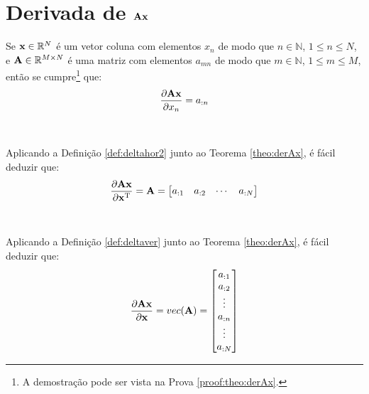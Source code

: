 
\section{Derivada de $\MATRIX{A}\VECTOR{x}$}

\begin{theorem}\label{theo:derAx}
Se 
$\VECTOR{x}\in \mathbb{R}^N$ é um vetor coluna com elementos $x_n$ de modo que
$n\in \mathbb{N}$, $1 \leq n \leq N$, e 
$\MATRIX{A} \in \mathbb{R}^{M\times N}$ é uma matriz com elementos $a_{mn}$ de modo que
$m\in \mathbb{N}$, $1 \leq m \leq M$, 
então se cumpre\footnote{A demostração pode ser vista na Prova \ref{proof:theo:derAx}.} que:
\begin{equation}
\frac{\partial \MATRIX{A}\VECTOR{x}}{\partial x_n}=a_{:n}
\end{equation}
\end{theorem}
~

\begin{corollary}\label{coro:derAx1}
Aplicando a Definição \ref{def:deltahor2} junto ao Teorema \ref{theo:derAx}, é
fácil deduzir que:
\begin{equation}
\frac{\partial \MATRIX{A}\VECTOR{x}}{\partial \VECTOR{x}^{\transpose}}=
\MATRIX{A}=
\left[
\begin{matrix}
 a_{:1} &  a_{:2} &  \cdots &  a_{:N}
\end{matrix}
\right]
\end{equation}
\end{corollary}
~

\begin{corollary}\label{coro:derAx2}
Aplicando a Definição \ref{def:deltaver} junto ao Teorema \ref{theo:derAx}, é
fácil deduzir que:
\begin{equation}
\frac{\partial \MATRIX{A}\VECTOR{x}}{\partial \VECTOR{x}}=\funcvec(\MATRIX{A})=
\left[
\begin{matrix}
 a_{:1} \\  
a_{:2} \\  
\vdots \\  
a_{:n} \\  
\vdots \\  
a_{:N}
\end{matrix}
\right]
\end{equation}
\end{corollary}

